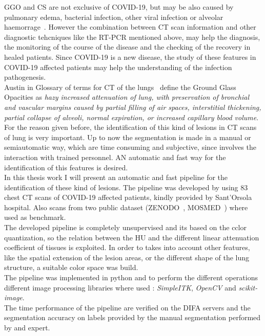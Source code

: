 \documentclass{standalone}
\begin{document}
GGO and CS are not exclusive of COVID-19, but may be also caused by pulmonary edema, bacterial infection, other viral infection or alveolar haemorrage~\cite{ART:Collins}. However the combination between CT scan information and other diagnostic tehcniques like the RT-PCR mentioned above, may help the diagnosis, the monitoring of the course of the disease and the checking of the recovery in healed patients. Since COVID-19 is a new disease, the study of these features in COVID-19 affected patients may help the understanding of the infection pathogenesis.\\
Austin in Glossary of terms for CT of the lungs~\cite{ART:Austin} define the Ground Glass Opacities as \emph{hazy increased attenuation of lung, with preservation of bronchial and vascular margins caused by partial filling of air spaces, interstitial thickening, partial collapse of alveoli, normal expiration, or increased capillary blood volume}.
For the reason given before, the identification of this kind of lesions in CT scans of lung is very important. Up to now the segmentation is made in a manual or semiautomatic way, which are time consuming and subjective, since involves the interaction with trained personnel. AN automatic and fast way for the identification of this features is desired.\\
In this thesis work I will present an automatic and fast pipeline for the identification of these kind of lesions. The pipeline was developed by using $83$ chest CT scans of COVID-19 affected patients, kindly provided by Sant'Orsola hospital. Also scans from two public dataset (ZENODO~\cite{DATA:ZENODO}, MOSMED~\cite{DATA:MOSMED}) where used as benchmark.\\
The developed pipeline is completely unsupervised and its based on the cclor quantization, so the relation between the HU and the different linear attenuation coefficient of tissues is exploited. In order to takes into account other features, like the spatial extension of the lesion areas, or the different shape of the lung structure, a suitable color space was build.\\
The pipeline was implemented in python and to perform the different operations different image processing libraries where used : \emph{SimpleITK}, \emph{OpenCV} and \emph{scikit-image}.\\
The time performance of the pipeline are verified on the DIFA servers and the segmentation accuracy on labels provided by the manual segmentation performed by and expert.
\end{document}
